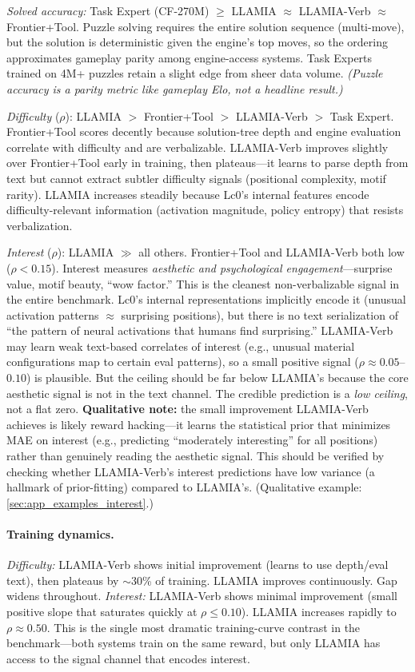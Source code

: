 \textit{Solved accuracy:} Task Expert (CF-270M) $\geq$ LLAMIA $\approx$
LLAMIA-Verb $\approx$ Frontier+Tool. Puzzle solving requires the
entire solution sequence (multi-move), but the solution is
deterministic given the engine's top moves, so the ordering
approximates gameplay parity among engine-access systems. Task
Experts trained on 4M+ puzzles retain a slight edge from sheer data
volume. \emph{(Puzzle accuracy is a parity metric like gameplay Elo,
not a headline result.)}

\textit{Difficulty} ($\rho$): LLAMIA $>$ Frontier+Tool $>$
LLAMIA-Verb $>$ Task Expert. Frontier+Tool scores decently because
solution-tree depth and engine evaluation correlate with difficulty
and are verbalizable. LLAMIA-Verb improves slightly over
Frontier+Tool early in training, then plateaus---it learns to parse
depth from text but cannot extract subtler difficulty signals
(positional complexity, motif rarity). LLAMIA increases steadily
because Lc0's internal features encode difficulty-relevant
information (activation magnitude, policy entropy) that resists
verbalization.

\textit{Interest} ($\rho$): LLAMIA $\gg$ all others. Frontier+Tool
and LLAMIA-Verb both low ($\rho < 0.15$). Interest measures
\emph{aesthetic and psychological engagement}---surprise value,
motif beauty, ``wow factor.'' This is the cleanest
non-verbalizable signal in the entire benchmark. Lc0's internal
representations implicitly encode it (unusual activation patterns
$\approx$ surprising positions), but there is no text serialization
of ``the pattern of neural activations that humans find surprising.''
LLAMIA-Verb may learn weak text-based correlates of interest (e.g.,
unusual material configurations map to certain eval patterns), so a
small positive signal ($\rho \approx 0.05$--$0.10$) is plausible.
But the ceiling should be far below LLAMIA's because the core
aesthetic signal is not in the text channel. The credible prediction
is a \emph{low ceiling}, not a flat zero. \textbf{Qualitative
note:} the small improvement LLAMIA-Verb achieves is likely reward
hacking---it learns the statistical prior that minimizes MAE on
interest (e.g., predicting ``moderately interesting'' for all
positions) rather than genuinely reading the aesthetic signal. This
should be verified by checking whether LLAMIA-Verb's interest
predictions have low variance (a hallmark of prior-fitting)
compared to LLAMIA's. (Qualitative example: \cref{sec:app_examples_interest}.)

\paragraph{Training dynamics.}
\textit{Difficulty:} LLAMIA-Verb shows initial improvement (learns
to use depth/eval text), then plateaus by $\sim$30\% of training.
LLAMIA improves continuously. Gap widens throughout.
\textit{Interest:} LLAMIA-Verb shows minimal improvement (small
positive slope that saturates quickly at $\rho \leq 0.10$). LLAMIA
increases rapidly to $\rho \approx 0.50$. This is the single most
dramatic training-curve contrast in the benchmark---both systems
train on the same reward, but only LLAMIA has access to the signal
channel that encodes interest.

